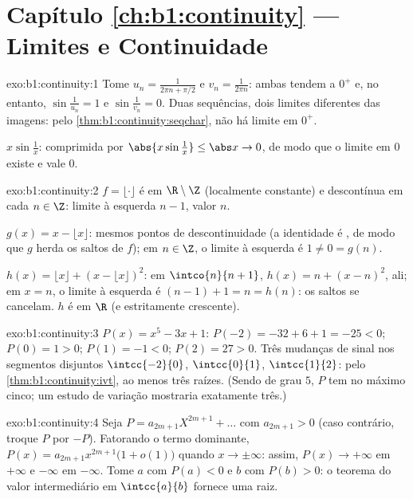 \section*{Capítulo \ref{ch:b1:continuity} --- Limites e Continuidade}

\begin{solution}{exo:b1:continuity:1}
Tome $u_n = \frac{1}{2\pi n + \pi/2}$ e $v_n = \frac{1}{2\pi n}$:
ambas tendem a $0^+$ e, no entanto, $\sin\frac{1}{u_n} = 1$ e
$\sin\frac{1}{v_n} = 0$. Duas sequências, dois limites diferentes das
imagens: pelo \cref{thm:b1:continuity:seqchar}, não há limite em $0^+$.

$x \sin\frac1x$: comprimida por $\abs{x\sin\frac1x} \leq \abs x \to 0$,
de modo que o limite em $0$ existe e vale $0$.
\end{solution}

\begin{solution}{exo:b1:continuity:2}
$f = \lfloor\cdot\rfloor$ é  em $\R \setminus \Z$
(localmente constante) e descontínua em cada $n \in \Z$: limite à
esquerda $n - 1$, valor $n$.

$g(x) = x - \lfloor x\rfloor$: mesmos pontos de descontinuidade (a
identidade é , de modo que $g$ herda os saltos de $f$); em $n \in
\Z$, o limite à esquerda é $1 \neq 0 = g(n)$.

$h(x) = \lfloor x\rfloor + (x - \lfloor x\rfloor)^2$: em $\intco{n}{n
+ 1}$, $h(x) = n + (x - n)^2$,  ali; em $x = n$, o limite à
esquerda é $(n-1) + 1 = n = h(n)$: os saltos se cancelam. $h$ é 
em $\R$ (e estritamente crescente).
\end{solution}

\begin{solution}{exo:b1:continuity:3}
$P(x) = x^5 - 3x + 1$: $P(-2) = -32 + 6 + 1 = -25 < 0$; $P(0) = 1 >
0$; $P(1) = -1 < 0$; $P(2) = 27 > 0$. Três mudanças de sinal nos
segmentos disjuntos $\intcc{-2}{0}$, $\intcc{0}{1}$, $\intcc{1}{2}$:
pelo \cref{thm:b1:continuity:ivt}, ao menos três raízes. (Sendo de
grau $5$, $P$ tem no máximo cinco; um estudo de variação mostraria
exatamente três.)
\end{solution}

\begin{solution}{exo:b1:continuity:4}
Seja $P = a_{2m+1}X^{2m+1} + \dots$ com $a_{2m+1} > 0$ (caso contrário, troque
$P$ por $-P$). Fatorando o termo dominante, $P(x) = a_{2m+1}
x^{2m+1}\bigl(1 + o(1)\bigr)$ quando $x \to \pm\infty$: assim, $P(x) \to
+\infty$ em $+\infty$ e $-\infty$ em $-\infty$. Tome $a$ com
$P(a) < 0$ e $b$ com $P(b) > 0$: o teorema do valor intermediário em
$\intcc{a}{b}$ fornece uma raiz.
\end{solution}

